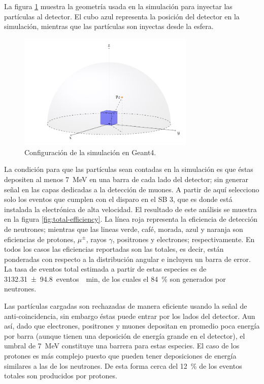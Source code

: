 La figura \ref{fig:sim-setup} muestra la geometría usada en la simulación para inyectar las partículas al detector. El cubo azul representa la posición del detector en la simulación, mientras que las partículas son inyectas desde la esfera.

\begin{figure}
        \centering
        \includegraphics[width=0.75\textwidth]{sim-setup.pdf}
        \caption{Configuración de la simulación en Geant4.}
        \label{fig:sim-setup}
\end{figure}

La condición para que las partículas sean contadas en la simulación es que éstas depositen al menos \SI{7}{\mega\electronvolt} en una barra de cada lado del detector; sin generar señal en las capas dedicadas a la detección de muones. A partir de aquí selecciono solo los eventos que cumplen con el disparo en el SB \num{3}, que es donde está instalada la electrónica de alta velocidad. El resultado de este análisis se muestra en la figura \ref{fig:total-efficiency}. La línea roja representa la eficiencia de detección de neutrones; mientras que las lineas verde, café, morada, azul y naranja son eficiencias de protones, $\mu^{\pm}$, rayos $\gamma$, positrones y electrones; respectivamente. En todos los casos las eficiencias reportadas son las totales, es decir, están ponderadas con respecto a la distribución angular e incluyen un barra de error. La tasa de eventos total estimada a partir de estas especies es de \SI{3132.31(9480)}{eventos \per\minute}, de los cuales el \SI{84}{\percent} son generados por neutrones.

Las partículas cargadas son rechazadas de manera eficiente usando la señal de anti-coincidencia, sin embargo éstas puede entrar por los lados del detector. Aun así, dado que electrones, positrones y muones depositan en promedio poca energía por barra (aunque tienen una deposición de energía grande en el detector), el umbral de \SI{7}{\mega\electronvolt} constituye una barrera para estas especies. El caso de los protones es más complejo
puesto que pueden tener deposiciones de energía similares a las de los neutrones. De esta forma cerca del \SI{12}{\percent} de los eventos totales son producidos por protones.

